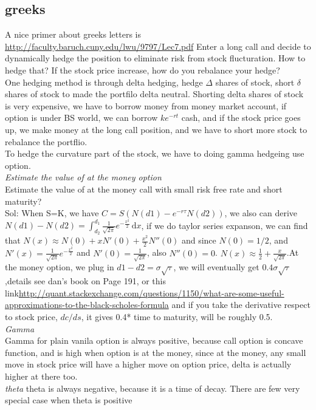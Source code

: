 \documentclass[a4paper,11pt]{article}
\begin{document}
\subsection{greeks}
A nice primer about greeks letters is \url{http://faculty.baruch.cuny.edu/lwu/9797/Lec7.pdf}
Enter a long call and decide to dynamically hedge the position to eliminate risk from stock flucturation. How to hedge that? If the stock price increase, how do you rebalance your hedge?\\
One hedging method is through delta hedging, hedge $\Delta$ shares of stock, short $\delta$ shares of stock to made the portfilo delta neutral. Shorting delta shares of stock is very expensive, we have to borrow money from money market account, if option is under BS world, we can borrow $ke^{-rt}$ cash, and if the stock price goes up, we make money at the long call position, and we have to short more stock to rebalance the portflio. \\
To hedge the curvature part of the stock, we have to doing gamma hedgeing use option.\\
{\em Estimate the value of at the money option}\\
Estimate the value of at the money call with small risk free rate and short maturity?\\
Sol: When S=K, we have $C=S(N(d1)-e^{-r\tau}N(d2))$, we also can derive $N(d1)-N(d2)=\int_{d_2}^{d_1} \! \frac{1}{\sqrt{2\pi}} e^{-\frac{x^{2}}{2}}\, \mathrm{d}x$, if we do taylor series expanson, we can find that $N(x)\approx  N(0)+xN'(0)+\frac{x^2}{2}N''(0)$ and since $N(0)=1/2$, and $N'(x)=\frac{1}{\sqrt{2\pi}}e^{-\frac{x^2}{2}}$ and $N'(0)=\frac{1}{\sqrt{2\pi}}$, also $N''(0)=0$. $N(x)\approx \frac{1}{2}+\frac{x}{\sqrt{2\pi}}$.At the money option, we plug in $d1-d2=\sigma\sqrt{\tau}$, we will eventually get $0.4\sigma\sqrt{\tau}$,details see dan's book on Page 191, or this link\url{http://quant.stackexchange.com/questions/1150/what-are-some-useful-approximations-to-the-black-scholes-formula}
and if you take the derivative respect to stock price, $dc/ds$, it gives 0.4* time to maturity, will be roughly 0.5.\\
{\em Gamma}\\Gamma for plain vanila option is always positive, because call option is concave function, and is high when option is at the money, since at the money, any small move in stock price will have a higher move on option price, delta is actually higher at there too. \\
{\em theta} theta is always negative, because it is a time of decay. There are few very special case when theta is positive\\
\end{document}
